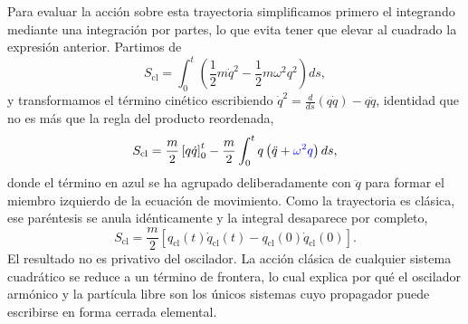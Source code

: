         Para evaluar la acción sobre esta trayectoria simplificamos primero el integrando mediante una integración por partes, lo que evita tener que elevar al cuadrado la expresión anterior. Partimos de
        \begin{equation}\label{eq:AccionOsc1}
            S_{\mathrm{cl}} = \int_{0}^{t}\left(\frac{1}{2}m\dot{q}^{2} - \frac{1}{2}m\omega^{2}q^{2}\right)ds,
        \end{equation}
        y transformamos el término cinético escribiendo $\dot{q}^{2} = \frac{d}{ds}(q\dot{q}) - q\ddot{q}$, identidad que no es más que la regla del producto reordenada,
        \begin{equation}\label{eq:AccionOsc2}
            S_{\mathrm{cl}} = \frac{m}{2}\left[q\dot{q}\right]_{0}^{t} - \frac{m}{2}\int_{0}^{t} q\left(\ddot{q} + \textcolor{blue}{\omega^{2}q}\right)ds,
        \end{equation}
        donde el término en azul se ha agrupado deliberadamente con $\ddot{q}$ para formar el miembro izquierdo de la ecuación de movimiento. Como la trayectoria es clásica, ese paréntesis se anula idénticamente y la integral desaparece por completo,
        \begin{equation}\label{eq:AccionOscFrontera}
            S_{\mathrm{cl}} = \frac{m}{2}\left[q_{\mathrm{cl}}(t)\dot{q}_{\mathrm{cl}}(t) - q_{\mathrm{cl}}(0)\dot{q}_{\mathrm{cl}}(0)\right].
        \end{equation}
        El resultado no es privativo del oscilador. La acción clásica de cualquier sistema cuadrático se reduce a un término de frontera, lo cual explica por qué el oscilador armónico y la partícula libre son los únicos sistemas cuyo propagador puede escribirse en forma cerrada elemental.

